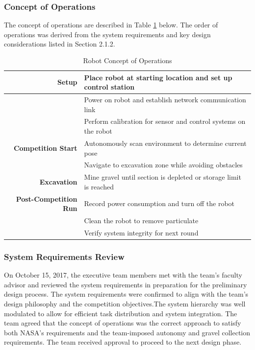\documentclass[class=article, crop=false]{standalone}
\begin{document}
	\subsubsection{Concept of Operations}
	The concept of operations are described in Table \ref{table:con_ops} below. The order of operations was derived from the system requirements and key design considerations listed in Section 2.1.2.
	
	\FloatBarrier
	\begin{table}[h]
	\small
	\centering
	\begin{tabular}{ | r | l |} 
 	\hline
 		\textbf{Setup}                & 
 		                                Place robot at starting location and set up control station \\ 
 		\hline
 		                              & Power on robot and establish network communication link \\
 		\hline
 		                              & Perform calibration for sensor and control systems on the robot \\
 		\hline\hline
 		\textbf{Competition Start}    & 
 		                                Autonomously scan environment to determine current pose \\
 		\hline
 		                              & Navigate to excavation zone while avoiding obstacles  \\
 		\hline\hline
 		\textbf{Excavation}           &
		                                Mine gravel until section is depleted or storage limit is reached \\
 		\hline\hline
 		\textbf{Post-Competition Run} &
 		                                Record power consumption and turn off the robot \\
 		\hline
 		                              & Clean the robot to remove particulate \\
 		\hline
 		                              & Verify system integrity for next round \\
 		\hline
	\end{tabular}
	\caption{Robot Concept of Operations}
		\label{table:con_ops}
	\end{table}
	\FloatBarrier
	
	\subsubsection{System Requirements Review}
	On October 15, 2017, the executive team members met with the team’s faculty advisor and reviewed the system requirements in preparation for the preliminary design process. The system requirements were confirmed to align with the team’s design philosophy and the competition objectives.The system hierarchy was well modulated to allow for efficient task distribution and system integration. The team agreed that the concept of operations was the correct approach to satisfy both NASA’s requirements and the team-imposed autonomy and gravel collection requirements. The team received approval to proceed to the next design phase.




	
\end{document}
